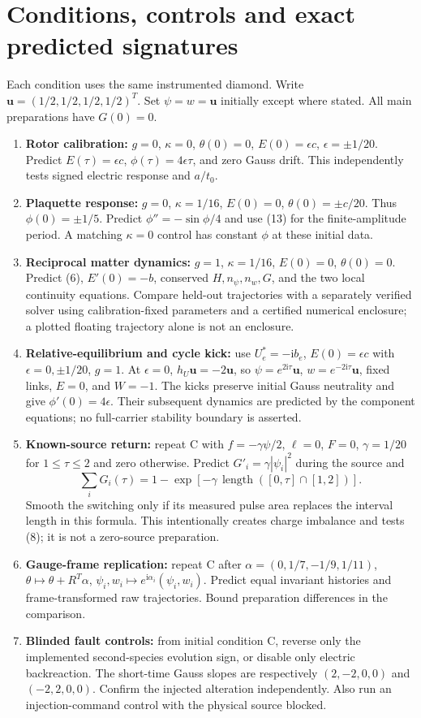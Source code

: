 \documentclass[10pt,a4paper]{article}
\newcommand{\ii}{\mathrm i}
\begin{document}
\section{Conditions, controls and exact predicted signatures}
Each condition uses the same instrumented diamond. Write $\mathbf u=(1/2,1/2,1/2,1/2)^T$. Set $\psi=w=\mathbf u$ initially except where stated. All main preparations have $G(0)=0$.
\begin{enumerate}[label=\textbf{\Alph*.},leftmargin=*]
\item \textbf{Rotor calibration:} $g=0$, $\kappa=0$, $\theta(0)=0$, $E(0)=\epsilon c$, $\epsilon=\pm1/20$. Predict $E(\tau)=\epsilon c$, $\phi(\tau)=4\epsilon\tau$, and zero Gauss drift. This independently tests signed electric response and $a/t_0$.
\item \textbf{Plaquette response:} $g=0$, $\kappa=1/16$, $E(0)=0$, $\theta(0)=\pm c/20$. Thus $\phi(0)=\pm1/5$. Predict $\phi''=-\sin\phi/4$ and use (13) for the finite-amplitude period. A matching $\kappa=0$ control has constant $\phi$ at these initial data.
\item \textbf{Reciprocal matter dynamics:} $g=1$, $\kappa=1/16$, $E(0)=0$, $\theta(0)=0$. Predict (6), $E'(0)=-b$, conserved $H,n_\psi,n_w,G$, and the two local continuity equations. Compare held-out trajectories with a separately verified solver using calibration-fixed parameters and a certified numerical enclosure; a plotted floating trajectory alone is not an enclosure.
\item \textbf{Relative-equilibrium and cycle kick:} use $U_e^*=-\ii b_e$, $E(0)=\epsilon c$ with $\epsilon=0,\pm1/20$, $g=1$. At $\epsilon=0$, $h_U\mathbf u=-2\mathbf u$, so $\psi=e^{2\ii\tau}\mathbf u$, $w=e^{-2\ii\tau}\mathbf u$, fixed links, $E=0$, and $W=-1$. The kicks preserve initial Gauss neutrality and give $\phi'(0)=4\epsilon$. Their subsequent dynamics are predicted by the component equations; no full-carrier stability boundary is asserted.
\item \textbf{Known-source return:} repeat C with $f=-\gamma\psi/2$, $\ell=0$, $F=0$, $\gamma=1/20$ for $1\le\tau\le2$ and zero otherwise. Predict $G'_i=\gamma|\psi_i|^2$ during the source and
\[
\sum_iG_i(\tau)=1-\exp[-\gamma\,\operatorname{length}([0,\tau]\cap[1,2])].
\]
Smooth the switching only if its measured pulse area replaces the interval length in this formula. This intentionally creates charge imbalance and tests (8); it is not a zero-source preparation.
\item \textbf{Gauge-frame replication:} repeat C after $\alpha=(0,1/7,-1/9,1/11)$, $\theta\mapsto\theta+R^T\alpha$, $\psi_i,w_i\mapsto e^{\ii\alpha_i}(\psi_i,w_i)$. Predict equal invariant histories and frame-transformed raw trajectories. Bound preparation differences in the comparison.
\item \textbf{Blinded fault controls:} from initial condition C, reverse only the implemented second-species evolution sign, or disable only electric backreaction. The short-time Gauss slopes are respectively $(2,-2,0,0)$ and $(-2,2,0,0)$. Confirm the injected alteration independently. Also run an injection-command control with the physical source blocked.
\end{enumerate}
\end{document}
